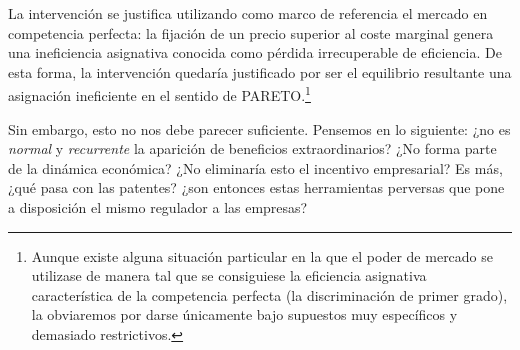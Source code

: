 \documentclass[10pt,a4paper]{article}
\begin{document}
La intervención se justifica utilizando como marco de referencia el mercado en competencia perfecta: la fijación de un precio superior al coste marginal genera una ineficiencia asignativa conocida como pérdida irrecuperable de eficiencia. De esta forma, la intervención quedaría justificado por ser el equilibrio resultante una asignación ineficiente en el sentido de PARETO.\footnote{%
    Aunque existe alguna situación particular en la que el poder de mercado se utilizase de manera tal que se consiguiese la eficiencia asignativa característica de la competencia perfecta (la discriminación de primer grado), la obviaremos por darse únicamente bajo supuestos muy específicos y demasiado restrictivos.
} 

Sin embargo, esto no nos debe parecer suficiente. Pensemos en lo siguiente: ¿no es \textit{normal} y \textit{recurrente} la aparición de beneficios extraordinarios? ¿No forma parte de la dinámica económica? ¿No eliminaría esto el incentivo empresarial? Es más, ¿qué pasa con las patentes? ¿son entonces estas herramientas perversas que pone a disposición el mismo regulador a las empresas?
\end{document}
